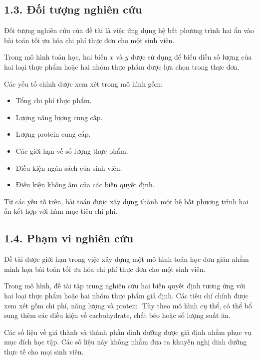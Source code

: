 \documentclass[12pt,a4paper]{article}
\begin{document}
\subsection*{1.3. Đối tượng nghiên cứu}

Đối tượng nghiên cứu của đề tài là việc ứng dụng hệ bất phương trình hai ẩn vào bài toán tối ưu hóa chi phí thực đơn cho một sinh viên.

Trong mô hình toán học, hai biến $x$ và $y$ được sử dụng để biểu diễn số lượng của hai loại thực phẩm hoặc hai nhóm thực phẩm được lựa chọn trong thực đơn.

Các yếu tố chính được xem xét trong mô hình gồm:

\begin{itemize}
    \item Tổng chi phí thực phẩm.
    \item Lượng năng lượng cung cấp.
    \item Lượng protein cung cấp.
    \item Các giới hạn về số lượng thực phẩm.
    \item Điều kiện ngân sách của sinh viên.
    \item Điều kiện không âm của các biến quyết định.
\end{itemize}
Từ các yếu tố trên, bài toán được xây dựng thành một hệ bất phương trình hai ẩn kết hợp với hàm mục tiêu chi phí.



\subsection*{1.4. Phạm vi nghiên cứu}

Đề tài được giới hạn trong việc xây dựng một mô hình toán học đơn giản nhằm minh họa bài toán tối ưu hóa chi phí thực đơn cho một sinh viên.

Trong mô hình, đề tài tập trung nghiên cứu hai biến quyết định tương ứng với hai loại thực phẩm hoặc hai nhóm thực phẩm giả định. Các tiêu
chí chính được xem xét gồm chi phí, năng lượng và protein. Tùy theo mô hình cụ thể, có thể bổ sung thêm các điều kiện về carbohydrate, chất béo hoặc số lượng suất ăn.

Các số liệu về giá thành và thành phần dinh dưỡng được giả định nhằm phục vụ mục đích học tập. Các số liệu này không nhằm đưa ra khuyến nghị dinh dưỡng thực tế cho mọi sinh viên.
\end{document}
